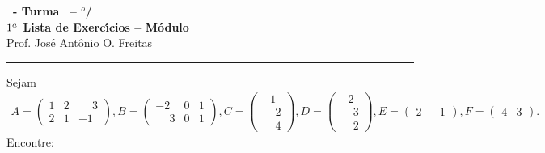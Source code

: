 \documentclass[12pt]{exam}
\begin{document}
    \begin{center}
    {\Large\bf \disciplina\ - Turma \turma\ -- \semestre$^{o}$/\ano} \\ \vspace{9pt} {\large\bf
        $1^a$ Lista de Exerc{\'\i}cios -- Módulo \numeromodulo}\\ \vspace{9pt} Prof. Jos{\'e} Ant{\^o}nio O. Freitas
    \end{center}
    \hrule

    \vspace{.6cm}

    \questao{}\label{operacoes_matrizes} Sejam
    \begin{align*}
        A = \begin{pmatrix}1 & 2 & \phantom{-} 3\\2 & 1 & -1\end{pmatrix},
        B = \begin{pmatrix}-2 & 0 & 1\\\phantom{-} 3 & 0 & 1\end{pmatrix},
        C = \begin{pmatrix}-1\\ \phantom{-} 2\\\phantom{-} 4\end{pmatrix},
        D = \begin{pmatrix}-2\\ \phantom{-} 3\\\phantom{-} 2\end{pmatrix},
        E = \begin{pmatrix}2 & -1\end{pmatrix},
        F = \begin{pmatrix}4 & 3\end{pmatrix}.
    \end{align*}
    Encontre:
\end{document}
